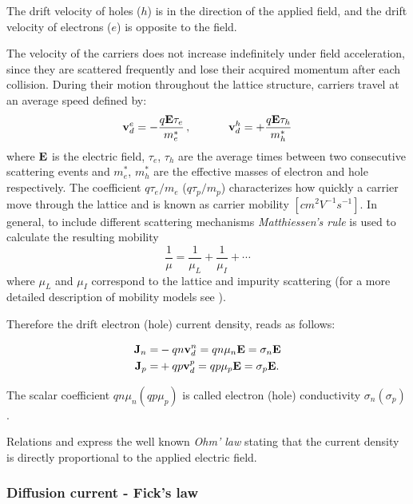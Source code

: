 \begin{Osservazione}
The drift velocity of holes ($h$) is in the direction of the applied field, and the drift velocity of electrons ($e$) is opposite to the field.
\end{Osservazione}

The velocity of the carriers does not increase indefinitely under field acceleration, since they are scattered frequently and lose their acquired momentum after each collision.
During their motion throughout the lattice structure, carriers travel at an average speed defined by:
\begin{equation}
\label{eq: velocities}
\vect{v}_d^e = - \dfrac{q\vect{E}\tau_e}{m_e^*} \, , \psp{20} 
\vect{v}_d^h = + \dfrac{q\vect{E}\tau_h}{m_h^*}
\end{equation}
where $\mathbf{E}$ is the electric field, $\tau_e$, $\tau_h$ are the average times between two consecutive scattering events and $m_e^*$, $m_h^*$ are the effective masses of electron and hole respectively.
The coefficient $q\tau_e / m_e$ ($q\tau_p / m_p$) characterizes how quickly a carrier move through the lattice and is known as carrier mobility $[cm^2V^{-1}s^{-1}]$.
In general, to include different scattering mechanisms \textit{Matthiessen's rule} is used to calculate the resulting mobility
\begin{equation}
\dfrac{1}{\mu} = \dfrac{1}{\mu_L} + \dfrac{1}{\mu_I} + \cdots
\end{equation}
where $\mu_L$ and $\mu_I$ correspond to the lattice and impurity scattering (for a more detailed description of mobility models see \cite{ModernVLSIdevices}). 

Therefore the drift electron (hole) current density, reads as follows:

\begin{align}
\mathbf{J}_n =& -qn\mathbf{v}_d^n = qn\mu_n\mathbf{E}   = \sigma_n\mathbf{E} \label{eq: drift electron} \\ 
\mathbf{J}_p =& +qp\mathbf{v}_d^p = qp\mu_p\mathbf{E} = \sigma_p\mathbf{E}. \label{eq: drift hole}
\end{align}

The scalar coefficient $qn\mu_n(qp\mu_p)$ is called electron (hole) conductivity $\sigma_n(\sigma_p)$. 

Relations  and  express the well known \textit{Ohm' law} stating that the current density is directly proportional to the applied electric field.


\subsubsection{Diffusion current - Fick's law}

